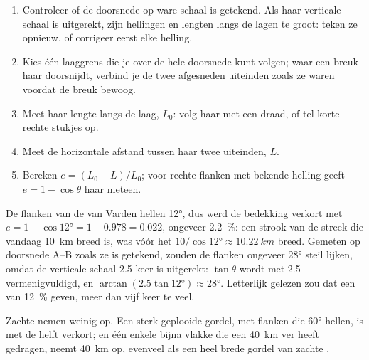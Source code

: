 \begin{method}\label{met:g12:mountain-building:shortening}
\begin{enumerate}
  \item Controleer of de doorsnede op ware schaal is getekend. Als haar verticale schaal
        is uitgerekt, zijn hellingen en lengten langs de lagen te groot: teken
        ze opnieuw, of corrigeer eerst elke helling.
  \item Kies één laaggrens die je over de hele doorsnede kunt volgen;
        waar een breuk haar doorsnijdt, verbind je de twee afgesneden uiteinden zoals ze waren voordat de
        breuk bewoog.
  \item Meet haar lengte langs de laag, $L_0$: volg haar met een draad,
        of tel korte rechte stukjes op.
  \item Meet de horizontale afstand tussen haar twee uiteinden, $L$.
  \item Bereken $e = (L_0 - L)/L_0$; voor rechte flanken met bekende helling
        geeft $e = 1 - \cos\theta$ haar meteen.
\end{enumerate}
\end{method}

\begin{example}\label{ex:g12:mountain-building:varden}
De flanken van de  van Varden hellen \ang{12}, dus werd de bedekking verkort met
$e = 1 - \cos\ang{12} = 1 - 0.978 = 0.022$, ongeveer \qty{2.2}{\percent}: een
strook van de streek die vandaag \qty{10}{km} breed is, was vóór het  $10/\cos\ang{12} \approx
\qty{10.22}{km}$ breed. Gemeten op doorsnede A--B zoals ze is getekend, zouden de
flanken ongeveer \ang{28} steil lijken, omdat de verticale schaal
2.5 keer is uitgerekt: $\tan\theta$ wordt met 2.5 vermenigvuldigd, en $\arctan(2.5
\tan\ang{12}) \approx \ang{28}$. Letterlijk gelezen zou dat een
 van \qty{12}{\percent} geven, meer dan vijf keer te veel.
\end{example}

Zachte  nemen weinig op. Een sterk geplooide gordel, met flanken die
\ang{60} hellen, is met de helft verkort; en één enkele bijna vlakke  die
een  \qty{40}{km} ver heeft gedragen, neemt \qty{40}{km}  op, evenveel
als een heel brede gordel van zachte .

